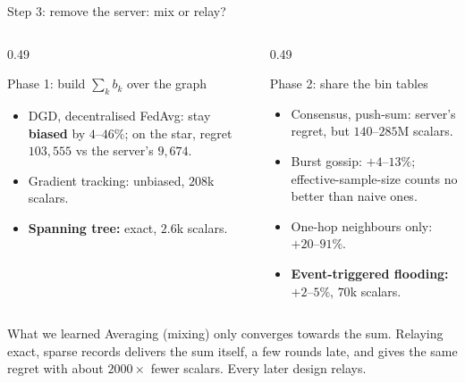 \documentclass[11pt]{beamer}
\begin{document}
\begin{frame}{Step 3: remove the server: mix or relay?}
\scriptsize
\begin{columns}[T]
\begin{column}{0.49\textwidth}
\begin{block}{Phase 1: build $\sum_kb_k$ over the graph}
\begin{itemize}
\item DGD, decentralised FedAvg: stay \textbf{biased} by $4$--$46\%$; on the star, regret $103{,}555$ vs the server's $9{,}674$.
\item Gradient tracking: unbiased, $208$k scalars.
\item \textbf{Spanning tree:} exact, $2.6$k scalars.
\end{itemize}
\end{block}
\end{column}
\begin{column}{0.49\textwidth}
\begin{block}{Phase 2: share the bin tables}
\begin{itemize}
\item Consensus, push-sum: server's regret, but $140$--$285$M scalars.
\item Burst gossip: $+4$--$13\%$; effective-sample-size counts no better than naive ones.
\item One-hop neighbours only: $+20$--$91\%$.
\item \textbf{Event-triggered flooding:} $+2$--$5\%$, $70$k scalars.
\end{itemize}
\end{block}
\end{column}
\end{columns}
\vspace{0.4em}
\begin{alertblock}{What we learned}
Averaging (mixing) only converges towards the sum. Relaying exact, sparse records delivers the sum itself, a few rounds late, and gives the same regret with about $2000\times$ fewer scalars. Every later design relays.
\end{alertblock}
\end{frame}
\end{document}
